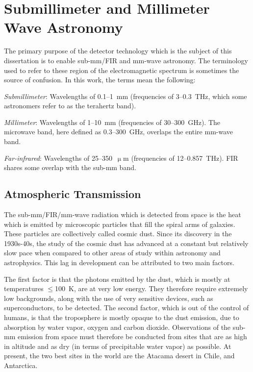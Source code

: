 \section{Submillimeter and Millimeter Wave Astronomy}\label{submillimeter}

The primary purpose of the detector technology which is the subject of this dissertation is to enable sub-mm/FIR and mm-wave astronomy. The terminology used to refer to these region of the electromagnetic spectrum is sometimes the source of confusion. In this work, the terms mean the following:

\vspace{5mm}

\textit{Submillimeter}: Wavelengths of 0.1--1~mm (frequencies of 3--0.3~THz, which some astronomers refer to as the terahertz band).

\vspace{5mm}

\textit{Millimeter}: Wavelengths of 1--10~mm (frequencies of 30--300~GHz). The microwave band, here defined as 0.3--300~GHz, overlaps the entire mm-wave band.
\vspace{5mm}

\textit{Far-infrared}: Wavelengths of 25--350~$\upmu$m (frequencies of 12--0.857~THz). FIR shares some overlap with the sub-mm band.

\subsection{Atmospheric Transmission}

The sub-mm/FIR/mm-wave radiation which is detected from space is the heat which is emitted by microscopic particles that fill the spiral arms of galaxies. These particles are collectively called cosmic dust. Since its discovery in the 1930s-40s, the study of the cosmic dust has advanced at a constant but relatively slow pace when compared to other areas of study within astronomy and astrophysics. This lag in development can be attributed to two main factors.

The first factor is that the photons emitted by the dust, which is mostly at temperatures $\leq$100~K, are at very low energy. They therefore require extremely low backgrounds, along with the use of very sensitive devices, such as superconductors, to be detected. The second factor, which is out of the control of humans, is that the troposphere is mostly opaque to the dust emission, due to absorption by water vapor, oxygen and carbon dioxide. Observations of the sub-mm emission from space must therefore be conducted from sites that are as high in altitude and as dry (in terms of precipitable water vapor) as possible. At present, the two best sites in the world are the Atacama desert in Chile, and Antarctica.

